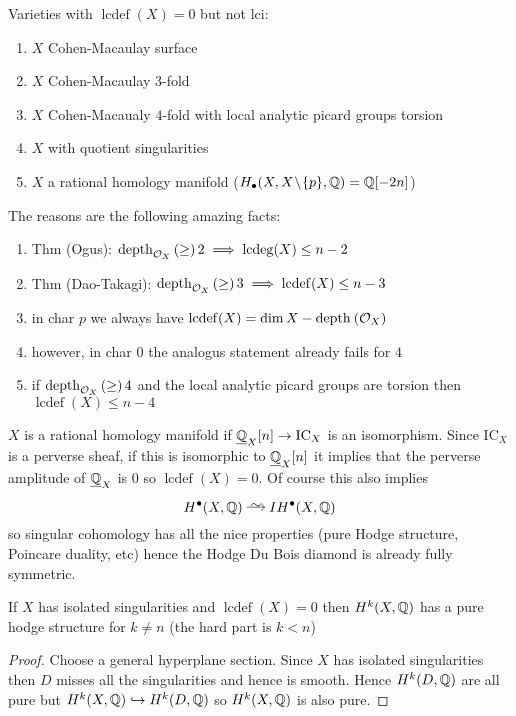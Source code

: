\documentclass[12pt]{article}
\DeclareMathOperator{\lcdef}{\mathrm{lcdef}}
\DeclareMathOperator{\lcdeg}{\mathrm{lcdeg}}
\begin{document}
\begin{example}
Varieties with $\lcdef(X) = 0$ but not lci:
\begin{enumerate}
\item $X$ Cohen-Macaulay surface
\item $X$ Cohen-Macaulay $3$-fold
\item $X$ Cohen-Macaualy $4$-fold with local analytic picard groups torsion
\item $X$ with quotient singularities
\item $X$ a rational homology manifold ($H_\bullet(X, X \! \setminus \! \{ p \}, \mathbb{Q}) = \mathbb{Q}[-2n]$)
\end{enumerate}
The reasons are the following amazing facts:
\begin{enumerate}
\item Thm (Ogus): $\depth{\struct{X}} \ge 2 \implies \lcdeg(X) \le n - 2$ 
\item Thm (Dao-Takagi): $\depth{\struct{X}} \ge 3 \implies \lcdef(X) \le n - 3$
\item in char $p$ we always have $\lcdef(X) = \dim{X} - \depth{}{\struct{X}}$
\item however, in char $0$ the analogus statement already fails for $4$
\item if $\mathrm{depth}_{\mathcal{O}_{X}} \left( \ge \right) 4$ and the local analytic picard groups are torsion then $\lcdef(X) \le n - 4$
\end{enumerate}
\end{example}

\newcommand{\IC}{\mathrm{IC}}

\begin{rmk}
$X$ is a rational homology manifold if $\ul{\Q}_X[n] \to \IC_X$ is an isomorphism. Since $\IC_X$ is a perverse sheaf, if this is isomorphic to $\underline{\mathbb{Q}}_X[n]$ it implies that the perverse amplitude of $\underline{\mathbb{Q}}_X$ is $0$ so $\lcdef(X) = 0$. Of course this also implies
\[ H^\bullet(X, \QQ) \iso IH^{\bullet}(X, \QQ) \]
so singular cohomology has all the nice properties (pure Hodge structure, Poincare duality, etc) hence the Hodge Du Bois diamond is already fully symmetric. 
\end{rmk}

\begin{cor}
If $X$ has isolated singularities and $\lcdef(X) = 0$ then $H^k(X, \mathbb{Q})$ has a pure hodge structure for $k \neq n$ (the hard part is $k < n$)
\end{cor}

\begin{proof}
Choose a general hyperplane section. Since $X$ has isolated singularities then $D$ misses all the singularities and hence is smooth. Hence $H^k(D, \mathbb{Q})$ are all pure but $H^k(X, \mathbb{Q}) \hookrightarrow H^k(D, \mathbb{Q})$ so $H^k(X, \mathbb{Q})$ is also pure. 
\end{proof}
\end{document}
